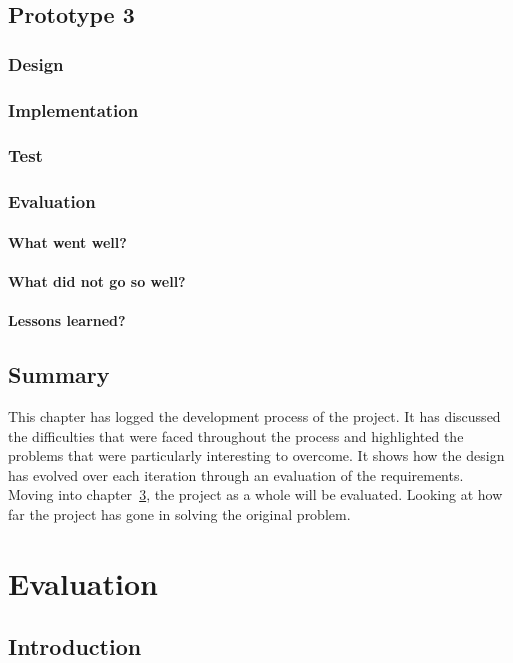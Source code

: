 \documentclass[11pt,oneside]{report}
\begin{document}
	\section{Prototype 3}\label{sec:p3}
		\subsection{Design}
		\subsection{Implementation}
		\subsection{Test}
		\subsection{Evaluation}
			\subsubsection{What went well?}
			\subsubsection{What did not go so well?}
			\subsubsection{Lessons learned?}
	\section{Summary}
	This chapter has logged the development process of the project.
	It has discussed the difficulties that were faced throughout the process and highlighted the problems that were particularly interesting to overcome.
	It shows how the design has evolved over each iteration through an evaluation of the requirements.
	Moving into chapter~\ref{chap:eval}, the project as a whole will be evaluated.
	Looking at how far the project has gone in solving the original problem.

	
	\chapter{Evaluation}\label{chap:eval}
	\section{Introduction}
\end{document}
